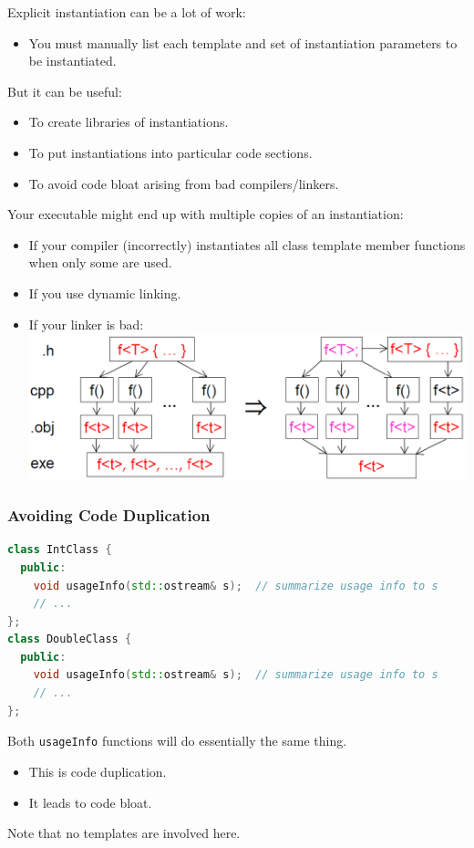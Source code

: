 Explicit instantiation can be a lot of work:
\begin{itemize}
  \item You must manually list each template and set of instantiation parameters to be instantiated.
\end{itemize}
But it can be useful:
\begin{itemize}
  \item To create libraries of instantiations.
  \item To put instantiations into particular code sections.
  \item To avoid code bloat arising from bad compilers/linkers.
\end{itemize}

Your executable might end up with multiple copies of an instantiation:
\begin{itemize}
  \item If your compiler (incorrectly) instantiates all class template member functions when only some are used.
  \item If you use dynamic linking.
  \item If your linker is bad:\\
  \includegraphics[width=0.6\linewidth]{images/AdvancedCPP/badLinker}
\end{itemize}

\subsubsection{Avoiding Code Duplication}
\begin{lstlisting}[language=C++]
class IntClass {
  public:
    void usageInfo(std::ostream& s);  // summarize usage info to s
    // ...
};
class DoubleClass {
  public:
    void usageInfo(std::ostream& s);  // summarize usage info to s
    // ...
};
\end{lstlisting}
Both \lstinline[language=C++]{usageInfo} functions will do essentially the same thing.
\begin{itemize}
  \item This is code duplication.
  \item It leads to code bloat.
\end{itemize}
Note that no templates are involved here.\\

